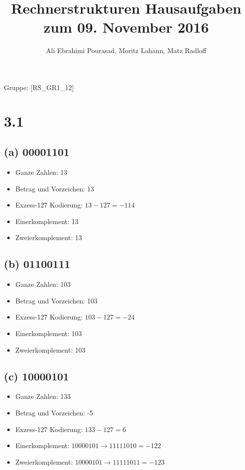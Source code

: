 \documentclass[11pt,a4paper]{article}
\title{\textbf{Rechnerstrukturen Hausaufgaben zum 09. November 2016}}
\author{Ali Ebrahimi Pourasad, Moritz Lahann, Matz Radloff}
\begin{document}
  \maketitle
  \date{}
  Gruppe: [RS\_GR1\_12]

\section*{3.1} %
\label {sec:3.1}

\subsection*{(a) 00001101}
\begin{itemize}
  \item Ganze Zahlen: 13
  \item Betrag und Vorzeichen: 13
  \item Exzess-127 Kodierung: $13-127 = -114$
  \item Einerkomplement: 13
  \item Zweierkomplement: 13
 \end{itemize}

\subsection*{(b) 01100111}
\begin{itemize}
  \item Ganze Zahlen: 103
  \item Betrag und Vorzeichen: 103
  \item Exzess-127 Kodierung: $103-127 = -24$
  \item Einerkomplement: 103
  \item Zweierkomplement: 103
 \end{itemize}

\subsection*{(c) 10000101}
\begin{itemize}
  \item Ganze Zahlen: 133
  \item Betrag und Vorzeichen: -5
  \item Exzess-127 Kodierung: $133-127 = 6$
  \item Einerkomplement: $10000101 \rightarrow 11111010 = -122$
  \item Zweierkomplement: $10000101 \rightarrow 11111011 = -123$
 \end{itemize}
\end{document}
